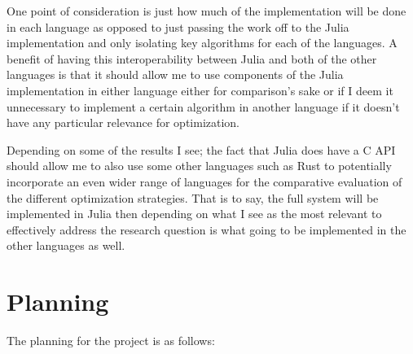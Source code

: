 \documentclass[11pt,a4paper,oneside]{article}
\begin{document}
\smallskip 
One point of consideration is just how much of the implementation will be done in each language as opposed to just passing the work off to the Julia implementation and only isolating key algorithms for each of the languages. A benefit of having this interoperability between Julia and both of the other languages is that it should allow me to use components of the Julia implementation in either language either for comparison's sake or if I deem it unnecessary to implement a certain algorithm in another language if it doesn't have any particular relevance for optimization. 

\smallskip
Depending on some of the results I see; the fact that Julia does have a C API should allow me to also use some other languages such as Rust to potentially incorporate an even wider range of languages for the comparative evaluation of the different optimization strategies. That is to say, the full system will be implemented in Julia then depending on what I see as the most relevant to effectively address the research question is what going to be implemented in the other languages as well.

\section{Planning}

The planning for the project is as follows:
\end{document}
